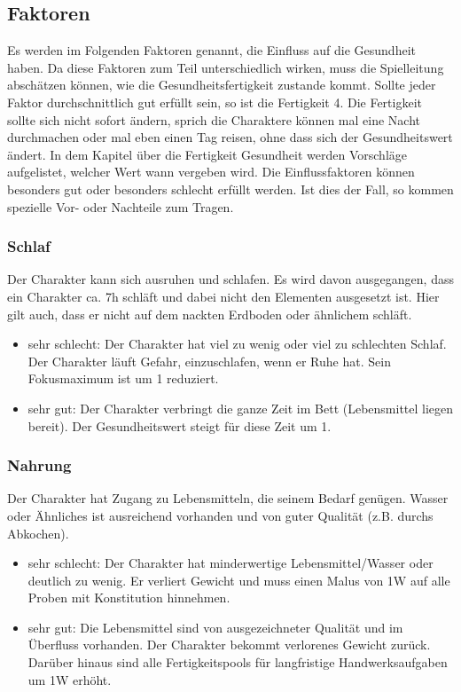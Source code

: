 \documentclass{article}
\begin{document}
\begin{center}
\subsection{Faktoren}
\end{center}

Es werden im Folgenden Faktoren genannt, die Einfluss auf die Gesundheit haben. Da diese Faktoren zum Teil
unterschiedlich wirken, muss die Spielleitung abschätzen können, wie die Gesundheitsfertigkeit zustande kommt. Sollte
jeder Faktor durchschnittlich gut erfüllt sein, so ist die Fertigkeit 4. Die Fertigkeit sollte sich nicht sofort ändern,
sprich die Charaktere können mal eine Nacht durchmachen oder mal eben einen Tag reisen, ohne dass sich der Gesundheitswert
ändert. In dem Kapitel über die Fertigkeit Gesundheit werden Vorschläge aufgelistet, welcher Wert wann vergeben wird.
Die Einflussfaktoren können besonders gut oder besonders schlecht erfüllt werden. Ist dies der Fall, so kommen spezielle
Vor- oder Nachteile zum Tragen.

\subsubsection{Schlaf}

Der Charakter kann sich ausruhen und schlafen. Es wird davon ausgegangen, dass ein Charakter ca. 7h schläft und dabei
nicht den Elementen ausgesetzt ist. Hier gilt auch, dass er nicht auf dem nackten Erdboden oder ähnlichem schläft.

\begin{itemize}
\item sehr schlecht: Der Charakter hat viel zu wenig oder viel zu schlechten Schlaf. Der Charakter läuft Gefahr, einzuschlafen, wenn er Ruhe hat. Sein Fokusmaximum ist um 1 reduziert.
\item sehr gut: Der Charakter verbringt die ganze Zeit im Bett (Lebensmittel liegen bereit). Der Gesundheitswert steigt für diese Zeit um 1.
\end{itemize}

\subsubsection{Nahrung}

Der Charakter hat Zugang zu Lebensmitteln, die seinem Bedarf genügen. Wasser oder Ähnliches ist ausreichend vorhanden
und von guter Qualität (z.B. durchs Abkochen).

\begin{itemize}
\item sehr schlecht: Der Charakter hat minderwertige Lebensmittel/Wasser oder deutlich zu wenig. Er verliert Gewicht und muss einen Malus von 1W auf alle Proben mit Konstitution hinnehmen.
\item sehr gut: Die Lebensmittel sind von ausgezeichneter Qualität und im Überfluss vorhanden. Der Charakter bekommt verlorenes Gewicht zurück. Darüber hinaus sind alle Fertigkeitspools für langfristige Handwerksaufgaben um 1W erhöht.
\end{itemize}
\end{document}
